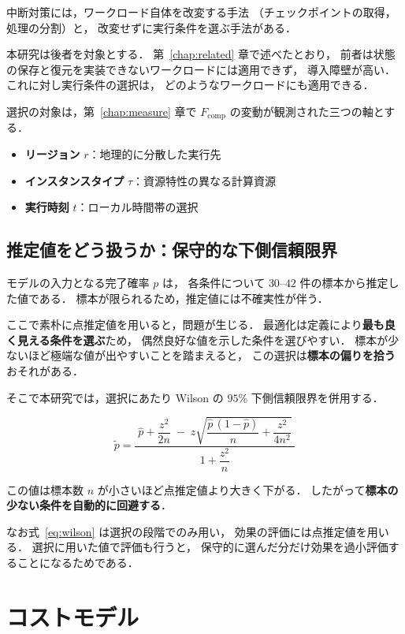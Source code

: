 \documentclass[11pt,a4paper]{ltjsreport}
\newcommand{\Fcomp}{F_{\mathrm{comp}}}
\begin{document}
中断対策には，ワークロード自体を改変する手法
（チェックポイントの取得，処理の分割）と，
改変せずに実行条件を選ぶ手法がある．

本研究は後者を対象とする．
第~\ref{chap:related} 章で述べたとおり，
前者は状態の保存と復元を実装できないワークロードには適用できず，
導入障壁が高い．
これに対し実行条件の選択は，
どのようなワークロードにも適用できる．

選択の対象は，第~\ref{chap:measure} 章で
$\Fcomp$ の変動が観測された三つの軸とする．

\begin{itemize}
  \item \textbf{リージョン} $r$：地理的に分散した実行先
  \item \textbf{インスタンスタイプ} $\tau$：資源特性の異なる計算資源
  \item \textbf{実行時刻} $t$：ローカル時間帯の選択
\end{itemize}

\subsection{推定値をどう扱うか：保守的な下側信頼限界}
\label{sec:why_lcb}

モデルの入力となる完了確率 $p$ は，
各条件について $30$--$42$ 件の標本から推定した値である．
標本が限られるため，推定値には不確実性が伴う．

ここで素朴に点推定値を用いると，問題が生じる．
最適化は定義により\textbf{最も良く見える条件を選ぶ}ため，
偶然良好な値を示した条件を選びやすい．
標本が少ないほど極端な値が出やすいことを踏まえると，
この選択は\textbf{標本の偏りを拾う}おそれがある．

そこで本研究では，選択にあたり
Wilson の $95\%$ 下側信頼限界を併用する．

\begin{equation}
\tilde p
=
\frac{\;\hat p + \dfrac{z^{2}}{2n}
      \;-\; z\sqrt{\dfrac{\hat p\,(1-\hat p)}{n} + \dfrac{z^{2}}{4n^{2}}}\;}
     {1 + \dfrac{z^{2}}{n}}
\label{eq:wilson}
\end{equation}

この値は標本数 $n$ が小さいほど点推定値より大きく下がる．
したがって\textbf{標本の少ない条件を自動的に回避する}．

なお式~\eqref{eq:wilson} は選択の段階でのみ用い，
効果の評価には点推定値を用いる．
選択に用いた値で評価も行うと，
保守的に選んだ分だけ効果を過小評価することになるためである．

\section{コストモデル}
\label{sec:model_def}
\end{document}
